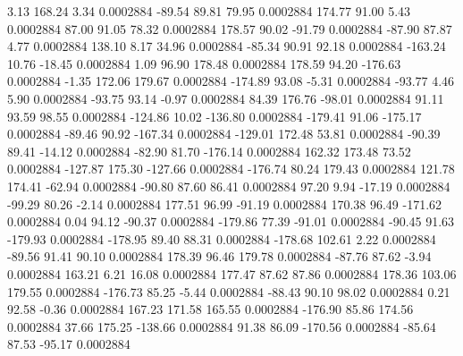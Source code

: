         3.13      168.24        3.34     0.0002884
      -89.54       89.81       79.95     0.0002884
      174.77       91.00        5.43     0.0002884
       87.00       91.05       78.32     0.0002884
      178.57       90.02      -91.79     0.0002884
      -87.90       87.87        4.77     0.0002884
      138.10        8.17       34.96     0.0002884
      -85.34       90.91       92.18     0.0002884
     -163.24       10.76      -18.45     0.0002884
        1.09       96.90      178.48     0.0002884
      178.59       94.20     -176.63     0.0002884
       -1.35      172.06      179.67     0.0002884
     -174.89       93.08       -5.31     0.0002884
      -93.77        4.46        5.90     0.0002884
      -93.75       93.14       -0.97     0.0002884
       84.39      176.76      -98.01     0.0002884
       91.11       93.59       98.55     0.0002884
     -124.86       10.02     -136.80     0.0002884
     -179.41       91.06     -175.17     0.0002884
      -89.46       90.92     -167.34     0.0002884
     -129.01      172.48       53.81     0.0002884
      -90.39       89.41      -14.12     0.0002884
      -82.90       81.70     -176.14     0.0002884
      162.32      173.48       73.52     0.0002884
     -127.87      175.30     -127.66     0.0002884
     -176.74       80.24      179.43     0.0002884
      121.78      174.41      -62.94     0.0002884
      -90.80       87.60       86.41     0.0002884
       97.20        9.94      -17.19     0.0002884
      -99.29       80.26       -2.14     0.0002884
      177.51       96.99      -91.19     0.0002884
      170.38       96.49     -171.62     0.0002884
        0.04       94.12      -90.37     0.0002884
     -179.86       77.39      -91.01     0.0002884
      -90.45       91.63     -179.93     0.0002884
     -178.95       89.40       88.31     0.0002884
     -178.68      102.61        2.22     0.0002884
      -89.56       91.41       90.10     0.0002884
      178.39       96.46      179.78     0.0002884
      -87.76       87.62       -3.94     0.0002884
      163.21        6.21       16.08     0.0002884
      177.47       87.62       87.86     0.0002884
      178.36      103.06      179.55     0.0002884
     -176.73       85.25       -5.44     0.0002884
      -88.43       90.10       98.02     0.0002884
        0.21       92.58       -0.36     0.0002884
      167.23      171.58      165.55     0.0002884
     -176.90       85.86      174.56     0.0002884
       37.66      175.25     -138.66     0.0002884
       91.38       86.09     -170.56     0.0002884
      -85.64       87.53      -95.17     0.0002884
